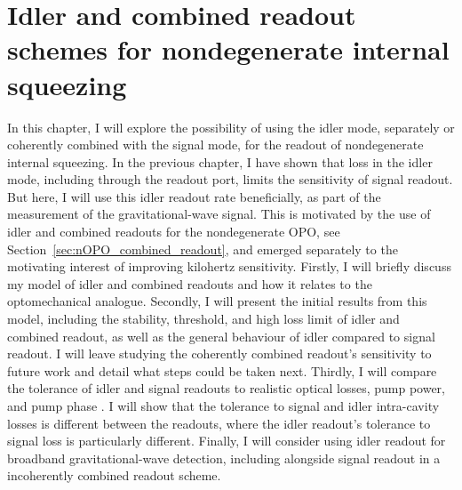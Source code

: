 \chapter{Idler and combined readout schemes for nondegenerate internal squeezing}
\label{chp:idler_readout}

In this chapter, I will explore the possibility of using the idler mode, separately or coherently combined with the signal mode, for the readout of nondegenerate internal squeezing. In the previous chapter, I have shown that loss in the idler mode, including through the readout port, limits the sensitivity of signal readout. But here, I will use this idler readout rate beneficially, as part of the measurement of the gravitational-wave signal. This is motivated by the use of idler and combined readouts for the nondegenerate OPO, see Section~\ref{sec:nOPO_combined_readout}, and emerged separately to the motivating interest of improving kilohertz sensitivity.
Firstly, I will briefly discuss my model of idler and combined readouts and how it relates to the optomechanical analogue.
Secondly, I will present the initial results from this model, including the stability, threshold, and high loss limit of idler and combined readout, as well as the general behaviour of idler compared to signal readout. I will leave studying the coherently combined readout's sensitivity to future work and detail what steps could be taken next.
Thirdly, I will compare the tolerance of idler and signal readouts to realistic optical losses, pump power, and pump phase . I will show that the tolerance to signal and idler intra-cavity losses is different between the readouts, where the idler readout's tolerance to signal loss is particularly different. 
Finally, I will consider using idler readout for broadband gravitational-wave detection, including alongside signal readout in a incoherently combined readout scheme. 


